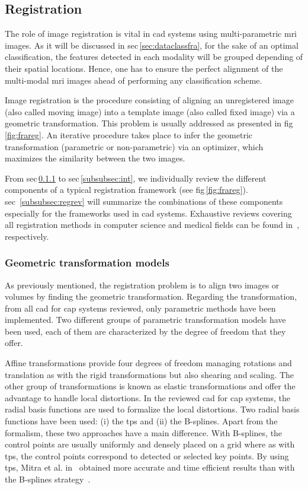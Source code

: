 \subsection{Registration} \label{subsec:registration}

The role of image registration is vital in \ac{cad} systems using multi-parametric \ac{mri} images. As it will be discussed in \ac{sec}\,\ref{sec:dataclassfra}, for the sake of an optimal classification, the features detected in each modality will be grouped depending of their spatial locations. Hence, one has to ensure the perfect alignment of the multi-modal \ac{mri} images ahead of performing any classification scheme.

Image registration is the procedure consisting of aligning an unregistered image (also called moving image) into a template image (also called fixed image) via a geometric transformation. This problem is usually addressed as presented in \ac{fig}\,\ref{fig:frareg}. An iterative procedure takes place to infer the geometric transformation (parametric or non-parametric) via an optimizer, which maximizes the similarity between the two images.

From \ac{sec}\,\ref{subsubsec:geotra} to \ac{sec}\,\ref{subsubsec:int}, we individually review the different components of a typical registration framework (see \ac{fig}\,\ref{fig:frareg}). \Acl{sec}~\ref{subsubsec:regrev} will summarize the combinations of these components especially for the frameworks used in \ac{cad} systems. Exhaustive reviews covering all registration methods in computer science and medical fields can be found in~\cite{Maintz1998,Zitova2003}, respectively.

\subsubsection{Geometric transformation models}\label{subsubsec:geotra}

As previously mentioned, the registration problem is to align two images or volumes by finding the geometric transformation. Regarding the transformation, from all \ac{cad} for \ac{cap} systems reviewed, only parametric methods have been implemented. Two different groups of parametric transformation models have been used, each of them are characterized by the degree of freedom that they offer.

Affine transformations provide four degrees of freedom managing rotations and translation as with the rigid transformations but also shearing and scaling. The other group of transformations is known as elastic transformations and offer the advantage to handle local distortions. In the reviewed \ac{cad} for \ac{cap} systems, the radial basis functions are used to formalize the local distortions. Two radial basis functions have been used: (i) the \ac{tps} and (ii) the B-splines. Apart from the formalism, these two approaches have a main difference. With B-splines, the control points are usually uniformly and densely placed on a grid where as with \ac{tps}, the control points correspond to detected or selected key points. By using \ac{tps}, Mitra et al. in~\cite{Mitra2011} obtained more accurate and time efficient results than with the B-splines strategy~\cite{Mitra2012a}.


